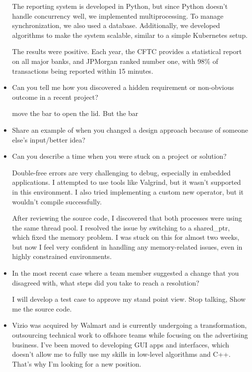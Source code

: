 \documentclass[a4paper,11pt,twoside]{book}
\begin{document}
\begin{itemize}
	The reporting system is developed in Python, but since Python doesn’t handle concurrency well, we implemented multiprocessing. To manage synchronization, we also used a database. Additionally, we developed algorithms to make the system scalable, similar to a simple Kubernetes setup.
	
	The results were positive. Each year, the CFTC provides a statistical report on all major banks, and JPMorgan ranked number one, with 98\% of transactions being reported within 15 minutes.
	
	\item Can you tell me how you discovered a hidden requirement or non-obvious outcome in a recent project?
	
	move the bar to open the lid. But the bar 
	
	\item Share an example of when you changed a design approach because of someone else’s input/better idea?
	
	\item Can you describe a time when you were stuck on a project or solution?
	
	Double-free errors are very challenging to debug, especially in embedded applications. I attempted to use tools like Valgrind, but it wasn’t supported in this environment. I also tried implementing a custom new operator, but it wouldn’t compile successfully.
	
	After reviewing the source code, I discovered that both processes were using the same thread pool. I resolved the issue by switching to a shared\_ptr, which fixed the memory problem. I was stuck on this for almost two weeks, but now I feel very confident in handling any memory-related issues, even in highly constrained environments.
	
	
	\item In the most recent case where a team member suggested a change that you disagreed with, what steps did
	you take to reach a resolution?
	
	I will develop a test case to approve my stand point view. Stop talking, Show me the source code. 
	
	\item Vizio was acquired by Walmart and is currently undergoing a transformation, outsourcing technical work to offshore teams while focusing on the advertising business. I’ve been moved to developing GUI apps and interfaces, which doesn’t allow me to fully use my skills in low-level algorithms and C++. That’s why I’m looking for a new position.
	

\end{itemize}
\end{document}
